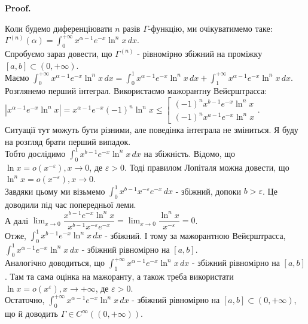 \documentclass[a4paper, 10pt]{article}
\makeatletter
\def\huge{\displaystyle}
\def\qed{$\blacksquare$}
\theoremstyle{theoremdd}
\theoremstyle{theoremdd}
\theoremstyle{theoremdd}
\theoremstyle{theoremdd}
\theoremstyle{theoremdd}
\theoremstyle{theoremdd}
\theoremstyle{theoremdd}
\theoremstyle{theoremdd}
\theoremstyle{theoremdd}
\renewenvironment{proof}[1][Proof.\\]{\par
\pushQED{\hfill \qed}%
\normalfont \topsep6\p@\@plus6\p@\relax
\trivlist
\item\relax
{\bfseries
#1\@addpunct{.}}\hspace\labelsep\ignorespaces
}{%
\popQED\endtrivlist\@endpefalse
}
\makeatother
\begin{document}
\begin{proof}
Коли будемо диференціювати $n$ разів $\Gamma$-функцію, ми очікуватимемо таке:\\
$\Gamma^{(n)}(\alpha) = \huge\int_0^{+\infty} x^{\alpha-1}e^{-x} \ln^n x\,dx$.\\
Спробуємо зараз довести, що $\Gamma^{(n)}$ - рівномірно збіжний на проміжку $[a,b] \subset (0,+\infty)$.\\
Маємо $\huge\int_0^{+\infty} x^{\alpha-1}e^{-x} \ln^n x\,dx = \huge\int_0^{1} x^{\alpha-1}e^{-x} \ln^n x\,dx + \huge\int_1^{+\infty} x^{\alpha-1}e^{-x} \ln^n x\,dx$.\\
Розглянемо перший інтеграл. Використаємо мажорантну Вейєрштрасса:\\
$|x^{\alpha-1}e^{-x} \ln^n x| = x^{\alpha-1}e^{-x} (-1)^n \ln^n x \leq \left[ \begin{gathered} (-1)^n x^{b-1}e^{-x}\ln^n x \\ (-1)^n x^{a-1}e^{-x}\ln^n x \end{gathered} \right.$.\\
Ситуації тут можуть бути різними, але поведінка інтеграла не зміниться. Я буду на розгляд брати перший випадок.\\
Тобто дослідимо $\huge\int_0^{1} x^{b-1}e^{-x}\ln^n x\,dx$ на збіжність. Відомо, що $\ln x = o(x^{-\varepsilon}), x \to 0$, де $\varepsilon > 0$. Тоді правилом Лопіталя можна довести, що $\ln^n x = o(x^{-\varepsilon}), x \to 0$.\\
Завдяки цьому ми візьмемо $\huge\int_0^1 x^{b-1} x^{-\varepsilon} e^{-x}\,dx$ - збіжний, допоки $b > \varepsilon$. Це доводили під час попередньої леми.\\
А далі $\huge\lim_{x \to 0} \dfrac{x^{b-1}e^{-x} \ln^n x}{x^{b-1} x^{-\varepsilon} e^{-x}} = \lim_{x \to 0} \dfrac{\ln^n x}{x^{-\varepsilon}} = 0$.\\
Отже, $\huge\int_0^{1} x^{b-1}e^{-x} \ln^n x\,dx$ - збіжний. І тому за мажорантною Вейєрштрасса, $\huge\int_0^1 x^{\alpha-1}e^{-x} \ln^n x\,dx$ - збіжний рівномірно на $[a,b]$.
\\
Аналогічно доводиться, що $\huge\int_1^{+\infty} x^{\alpha-1} e^{-x}\ln^n x\,dx$ - збіжний рівномірно на $[a,b]$. Там та сама оцінка на мажоранту, а також треба використати $\ln x = o(x^{\varepsilon}), x \to +\infty$, де $\varepsilon >0$.\\ 
Остаточно, $\huge\int_0^{+\infty} x^{\alpha-1}e^{-x} \ln^n x\,dx$ - збіжний рівномірно на $[a,b] \subset (0,+\infty)$, що й доводить $\Gamma \in C^{\infty}((0,+\infty))$.
\end{proof}
\end{document}
